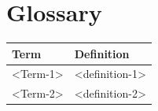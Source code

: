 \section{Glossary}\label{section-glossary}

\begin{longtable}[]{@{}ll@{}}
\toprule
\begin{minipage}[b]{0.47\columnwidth}\raggedright\strut
Term\strut
\end{minipage} & \begin{minipage}[b]{0.47\columnwidth}\raggedright\strut
Definition\strut
\end{minipage}\tabularnewline
\midrule
\endhead
\begin{minipage}[t]{0.47\columnwidth}\raggedright\strut
\textless{}Term-1\textgreater{}\strut
\end{minipage} & \begin{minipage}[t]{0.47\columnwidth}\raggedright\strut
\textless{}definition-1\textgreater{}\strut
\end{minipage}\tabularnewline
\begin{minipage}[t]{0.47\columnwidth}\raggedright\strut
\textless{}Term-2\textgreater{}\strut
\end{minipage} & \begin{minipage}[t]{0.47\columnwidth}\raggedright\strut
\textless{}definition-2\textgreater{}\strut
\end{minipage}\tabularnewline
\bottomrule
\end{longtable}
